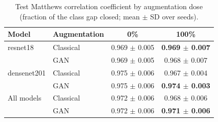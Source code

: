 \begin{table}[htbp]
\centering
\caption{Test Matthews correlation coefficient by augmentation dose (fraction of the class gap closed; mean $\pm$ SD over seeds).}
\label{tab:dose_mcc}
\begin{tabular}{llcc}
\toprule
Model & Augmentation & 0\% & 100\% \\
\midrule
resnet18 & Classical & 0.969 $\pm$ 0.005 & \textbf{0.969 $\pm$ 0.007} \\
 & GAN & 0.969 $\pm$ 0.005 & 0.968 $\pm$ 0.007 \\
\addlinespace
densenet201 & Classical & 0.975 $\pm$ 0.006 & 0.967 $\pm$ 0.004 \\
 & GAN & 0.975 $\pm$ 0.006 & \textbf{0.974 $\pm$ 0.003} \\
\addlinespace
All models & Classical & 0.972 $\pm$ 0.006 & 0.968 $\pm$ 0.006 \\
 & GAN & 0.972 $\pm$ 0.006 & \textbf{0.971 $\pm$ 0.006} \\
\bottomrule
\end{tabular}
\end{table}